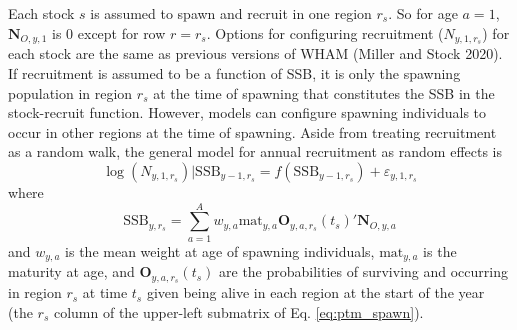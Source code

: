 \documentclass[
]{article}
\begin{document}
Each stock \(s\) is assumed to spawn and recruit in one region \(r_s\).
So for age \(a=1\), \(\mathbf{N}_{O,y,1}\) is 0 except for row
\(r = r_s\). Options for configuring recruitment (\(N_{y,1,r_s}\)) for
each stock are the same as previous versions of WHAM (Miller and Stock
2020). If recruitment is assumed to be a function of SSB, it is only the
spawning population in region \(r_s\) at the time of spawning that
constitutes the SSB in the stock-recruit function. However, models can
configure spawning individuals to occur in other regions at the time of
spawning. Aside from treating recruitment as a random walk, the general
model for annual recruitment as random effects is \begin{equation*}
\log\left(N_{y,1,r_s}\right)|\text{SSB}_{y-1,r_s} =  f\left(\text{SSB}_{y-1,r_s}\right) + \varepsilon_{y,1,r_s}
\end{equation*} where\\
\[\text{SSB}_{y,r_s} =  \sum^A_{a=1}  w_{y,a} \text{mat}_{y,a} \mathbf{O}_{y,a,r_s}(t_s)' \mathbf{N}_{O,y,a}\]
and \(w_{y,a}\) is the mean weight at age of spawning individuals,
\(\text{mat}_{y,a}\) is the maturity at age, and
\(\mathbf{O}_{y,a,r_s}(t_s)\) are the probabilities of surviving and
occurring in region \(r_s\) at time \(t_s\) given being alive in each
region at the start of the year (the \(r_s\) column of the upper-left
submatrix of Eq. \ref{eq:ptm_spawn}).
\end{document}
